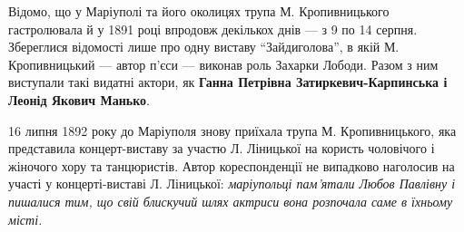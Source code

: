 Відомо, що у Маріуполі та його околицях трупа М. Кропивницького гастролювала й
у 1891 році впродовж декількох днів — з 9 по 14 серпня. Збереглися відомості
лише про одну виставу \enquote{Зайдиголова}, в якій М. Кропивницький — автор п'єси —
виконав роль Захарки Лободи. Разом з ним виступали такі видатні актори, як
\textbf{Ганна Петрівна Затиркевич-Карпинська і Леонід Якович Манько}.



16 липня 1892 року до Маріуполя знову приїхала трупа М. Кропивницького, яка
представила концерт-виставу за участю Л. Ліницької на користь чоловічого і
жіночого хору та танцюристів. Автор кореспонденції не випадково наголосив на
участі у концерті-виставі Л. Ліницької: \emph{маріупольці пам'ятали Любов Павлівну і
пишалися тим, що свій блискучий шлях актриси вона розпочала саме в їхньому
місті.}

